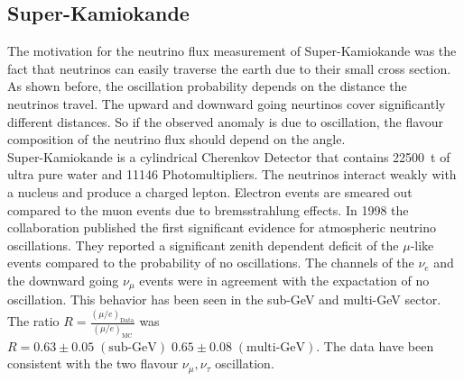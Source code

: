 \subsection{Super-Kamiokande}
The motivation for the neutrino flux measurement of Super-Kamiokande was the fact that neutrinos can easily traverse the earth due to their small cross section. As shown before, the oscillation probability depends on the distance the neutrinos travel. The upward and downward going neurtinos cover significantly different distances. So if the observed anomaly is due to oscillation, the flavour composition of the neutrino flux should depend on the angle.\\
Super-Kamiokande is a cylindrical Cherenkov Detector that contains \SI{22500}{\tonne} of ultra pure water and \num{11146} Photomultipliers. The neutrinos interact weakly with a nucleus and produce a charged lepton. Electron events are smeared out compared to the muon events due to bremsstrahlung effects. In 1998 the collaboration published the first significant evidence for atmospheric neutrino oscillations. They reported a significant zenith dependent deficit of the $\mu$-like events compared to the probability of no oscillations. The channels of the $\nu_e$ and the downward going $\nu_{\mu}$ events were in agreement with the expactation of no oscillation. This behavior has been seen in the sub-\si{\giga\electronvolt} and multi-\si{\giga\electronvolt} sector. The ratio $R=\frac{(\mu/e)_{\text{Data}}}{(\mu/e)_{\text{MC}}}$ was $R=0.63 \pm 0.05 \; (\text{sub-}\si{\giga\electronvolt}) \; 0.65\pm 0.08 \; (\text{multi-}\si{\giga\electronvolt})$.
The data have been consistent with the two flavour $\nu_{\mu},\nu_{\tau}$ oscillation.

